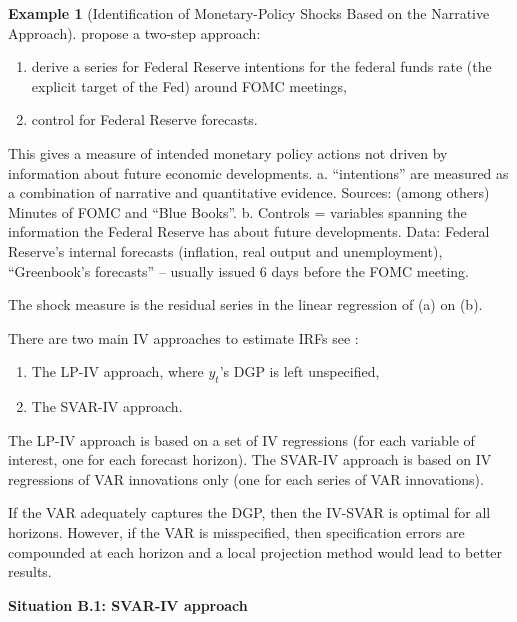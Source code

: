 \documentclass[
  12pt,
]{book}
\providecommand{\tightlist}{%
  \setlength{\itemsep}{0pt}\setlength{\parskip}{0pt}}
\theoremstyle{definition}
\theoremstyle{definition}
\newtheorem{example}{Example}[chapter]
\theoremstyle{definition}
\theoremstyle{definition}
\theoremstyle{remark}
\begin{document}
\begin{example}[Identification of Monetary-Policy Shocks Based on the Narrative Approach]
\protect\hypertarget{exm:RomerRomer}{}\label{exm:RomerRomer}\citet{Romer_Romer_2004} propose a two-step approach:

\begin{enumerate}
\def\labelenumi{\alph{enumi}.}
\tightlist
\item
  derive a series for Federal Reserve intentions for the federal funds rate (the explicit target of the Fed) around FOMC meetings,
\item
  control for Federal Reserve forecasts.
\end{enumerate}

This gives a measure of intended monetary policy actions not driven by information about future economic developments.
a. ``intentions'' are measured as a combination of narrative and quantitative evidence. Sources: (among others) Minutes of FOMC and ``Blue Books''.
b. Controls = variables spanning the information the Federal Reserve has about future developments. Data: Federal Reserve's internal forecasts (inflation, real output and unemployment), ``Greenbook's forecasts'' -- usually issued 6 days before the FOMC meeting.

The shock measure is the residual series in the linear regression of (a) on (b).
\end{example}

There are two main IV approaches to estimate IRFs see \citet{Stock_Watson_2018}:

\begin{enumerate}
\def\labelenumi{\alph{enumi}.}
\tightlist
\item
  The LP-IV approach, where \(y_t\)'s DGP is left unspecified,
\item
  The SVAR-IV approach.
\end{enumerate}

The LP-IV approach is based on a set of IV regressions (for each variable of interest, one for each forecast horizon). The SVAR-IV approach is based on IV regressions of VAR innovations only (one for each series of VAR innovations).

If the VAR adequately captures the DGP, then the IV-SVAR is optimal for all horizons. However, if the VAR is misspecified, then specification errors are compounded at each horizon and a local projection method would lead to better results.

\textbf{Situation B.1: SVAR-IV approach}
\end{document}
